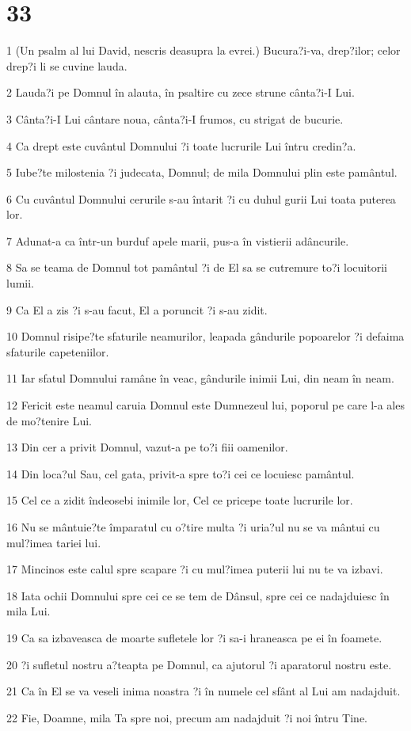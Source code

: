 \chapter{33}

\par 1 (Un psalm al lui David, nescris deasupra la evrei.) Bucura?i-va, drep?ilor; celor drep?i li se cuvine lauda.
\par 2 Lauda?i pe Domnul în alauta, în psaltire cu zece strune cânta?i-I Lui.
\par 3 Cânta?i-I Lui cântare noua, cânta?i-I frumos, cu strigat de bucurie.
\par 4 Ca drept este cuvântul Domnului ?i toate lucrurile Lui întru credin?a.
\par 5 Iube?te milostenia ?i judecata, Domnul; de mila Domnului plin este pamântul.
\par 6 Cu cuvântul Domnului cerurile s-au întarit ?i cu duhul gurii Lui toata puterea lor.
\par 7 Adunat-a ca într-un burduf apele marii, pus-a în vistierii adâncurile.
\par 8 Sa se teama de Domnul tot pamântul ?i de El sa se cutremure to?i locuitorii lumii.
\par 9 Ca El a zis ?i s-au facut, El a poruncit ?i s-au zidit.
\par 10 Domnul risipe?te sfaturile neamurilor, leapada gândurile popoarelor ?i defaima sfaturile capeteniilor.
\par 11 Iar sfatul Domnului ramâne în veac, gândurile inimii Lui, din neam în neam.
\par 12 Fericit este neamul caruia Domnul este Dumnezeul lui, poporul pe care l-a ales de mo?tenire Lui.
\par 13 Din cer a privit Domnul, vazut-a pe to?i fiii oamenilor.
\par 14 Din loca?ul Sau, cel gata, privit-a spre to?i cei ce locuiesc pamântul.
\par 15 Cel ce a zidit îndeosebi inimile lor, Cel ce pricepe toate lucrurile lor.
\par 16 Nu se mântuie?te împaratul cu o?tire multa ?i uria?ul nu se va mântui cu mul?imea tariei lui.
\par 17 Mincinos este calul spre scapare ?i cu mul?imea puterii lui nu te va izbavi.
\par 18 Iata ochii Domnului spre cei ce se tem de Dânsul, spre cei ce nadajduiesc în mila Lui.
\par 19 Ca sa izbaveasca de moarte sufletele lor ?i sa-i hraneasca pe ei în foamete.
\par 20 ?i sufletul nostru a?teapta pe Domnul, ca ajutorul ?i aparatorul nostru este.
\par 21 Ca în El se va veseli inima noastra ?i în numele cel sfânt al Lui am nadajduit.
\par 22 Fie, Doamne, mila Ta spre noi, precum am nadajduit ?i noi întru Tine.

